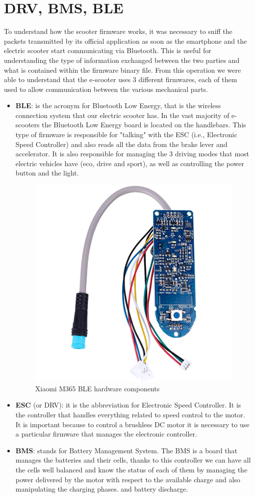 \documentclass[binding=0.6cm,LaM,noexaminfo]{sapthesis}
\begin{document}
\section{DRV, BMS, BLE}
To understand how the scooter firmware works, it was necessary to sniff the packets transmitted by its official application as soon as the smartphone and the electric scooter start communicating via Bluetooth. This is useful for understanding the type of information exchanged between the two parties and what is contained within the firmware binary file. From this operation we were able to understand that the e-scooter uses 3 different firmwares, each of them used to allow communication between the various mechanical parts. 
\begin{itemize}
    \item \textbf{BLE}: is the acronym for Bluetooth Low Energy, that is the wireless connection system that our electric scooter has. In the vast majority of e-scooters the Bluetooth Low Energy board is located on the handlebars. This type of firmware is responsible for "talking" with the ESC (i.e., Electronic Speed Controller) and also reads all the data from the brake lever and accelerator. It is also responsible for managing the 3 driving modes that most electric vehicles have (eco, drive and sport), as well as controlling the power button and the light.
    
    \newpage
    \begin{figure}[!htp]
    \centering
    \includegraphics[width = .5\textwidth]{images/dashboard.png}
    \caption{Xiaomi M365 BLE hardware components}
    \label{fig:my_label}
    \end{figure}

    \item \textbf{ESC} (or DRV): it is the abbreviation for Electronic Speed Controller. It is the controller that handles everything related to speed control to the motor. It is important because to control a brushless DC motor it is necessary to use a particular firmware that manages the electronic controller.
    
    \item \textbf{BMS}: stands for Battery Management System. The BMS is a board that manages the batteries and their cells, thanks to this controller we can have all the cells well balanced and know the status of each of them by managing the power delivered by the motor with respect to the available charge and also manipulating the charging phases. and battery discharge.
\end{itemize}
\end{document}
